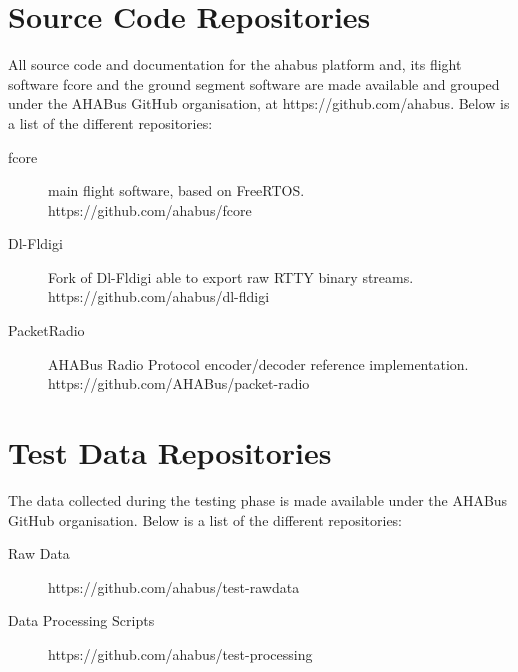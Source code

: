 \begin{appendices}

\chapter{Source Code Repositories}
\label{apx:source-repos}

All source code and documentation for the \acrfull{ahabus} platform and, its flight software \acrfull{fcore} and the ground segment software are made available and grouped under the AHABus GitHub organisation, at https://github.com/ahabus. Below is a list of the different repositories:

\begin{description}
\item[\acrshort{fcore}] main flight software, based on FreeRTOS.\\https://github.com/ahabus/fcore

\item[Dl-Fldigi] Fork of Dl-Fldigi able to export raw RTTY binary streams.\\https://github.com/ahabus/dl-fldigi

\item[PacketRadio] AHABus Radio Protocol encoder/decoder reference implementation.\\https://github.com/AHABus/packet-radio
\end{description}

\chapter{Test Data Repositories}
\label{apx:test-data-repos}

The data collected during the testing phase is made available under the AHABus GitHub organisation. Below is a list of the different repositories:

\begin{description}
\item[Raw Data] https://github.com/ahabus/test-rawdata

\item[Data Processing Scripts] https://github.com/ahabus/test-processing
\end{description}

\end{appendices}
